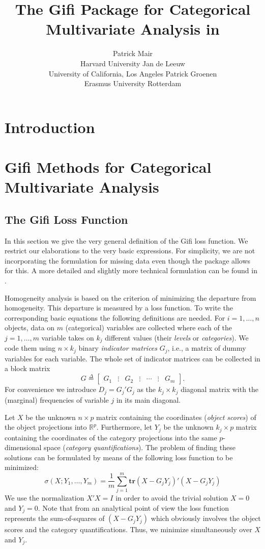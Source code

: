 \documentclass[10pt,nojss,nofooter,fleqn]{jss}\usepackage[]{graphicx}\usepackage[]{color}
\author{Patrick Mair \\ Harvard University \And 
        Jan de Leeuw \\ University of California, Los Angeles \AND
        Patrick Groenen \\ Erasmus University Rotterdam
}
\title{The Gifi Package for Categorical Multivariate Analysis in \proglang{R}}
\newcommand{\defi}{\mathop{=}\limits^{\Delta}}
\begin{document}
\section{Introduction}
\label{sec:int}


\section{Gifi Methods for Categorical Multivariate Analysis}
\label{sec:gifi}

\subsection{The Gifi Loss Function}
In this section we give the very general definition of the Gifi loss function. 
We restrict our elaborations to the very basic expressions. For simplicity, we are not incorporating the formulation for missing data even though the package allows for this. A more detailed and slightly more technical formulation can be found in \citet{deLeeuw+Mair:2009a}. 


Homogeneity analysis is based on the criterion of minimizing the departure from homogeneity. This departure is measured by a loss function. To write the corresponding basic equations the following definitions are needed. For $i=1,\ldots,n$ objects, data on $m$ (categorical) variables are collected where each of the $j=1,\ldots,m$ variable takes on $k_j$ different values (their \emph{levels} or \emph{categories}). We code them using $n\times k_j$ binary \emph{indicator matrices} $G_j$, i.e., a matrix of dummy variables for each variable. The whole set of indicator matrices can be collected in a block matrix
\begin{equation}
G\defi\begin{bmatrix}G_1&\vdots&G_2&\vdots&\cdots&\vdots&G_m\end{bmatrix}.
\end{equation}
For convenience we introduce $D_j^{}=G_j'G_j^{}$ as the $k_j\times k_j$ diagonal matrix with the (marginal) frequencies of variable $j$ in its main diagonal. 

Let $X$ be the unknown $n\times p$ matrix containing the coordinates (\emph{object scores}) of the object projections into $\mathbb{R}^p$. Furthermore, let $Y_j$ be the unknown $k_j \times p$ matrix containing the coordinates of the category projections into the same $p$-dimensional space (\emph{category quantifications}). 
The problem of finding these solutions can be formulated by means of the following loss function to be minimized:
\begin{equation}
\label{eq:loss}
\sigma(X;Y_1,\ldots,Y_m) = \frac{1}{m} \sum_{j=1}^m\mathbf{tr}(X-G_jY_j)'(X-G_jY_j)
\end{equation}
We use the normalization $X'X=I$ in order to avoid the trivial solution $X=0$ and $Y_j=0$. Note that from an analytical point of view the loss function represents the sum-of-squares of $(X-G_jY_j)$ which obviously involves the object scores and the category quantifications. Thus, we minimize simultaneously over $X$ and $Y_j$. 
\end{document}
